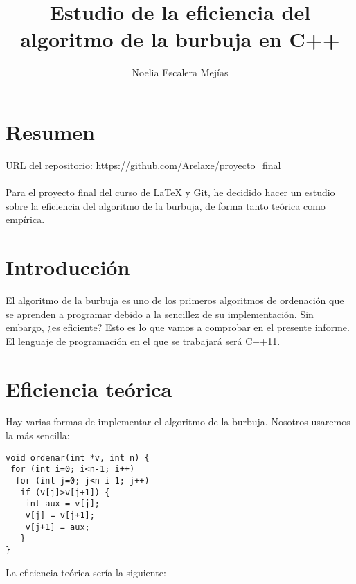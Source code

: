 \documentclass[a4paper,11pt]{article}
\begin{document}
\title{Estudio de la eficiencia del algoritmo de la burbuja en C++}
\author{Noelia Escalera Mejías}
\date{}
\maketitle
\section{Resumen}
URL del repositorio:
\url{https://github.com/Arelaxe/proyecto_final}
\\ \\
Para el proyecto final del curso de LaTeX y Git, he decidido hacer un estudio sobre la eficiencia del algoritmo de la burbuja, de forma tanto teórica como empírica.
\section{Introducción}
El algoritmo de la burbuja es uno de los primeros algoritmos de ordenación que se aprenden a programar debido a la sencillez de su implementación. Sin embargo, ¿es eficiente? Esto es lo que vamos a comprobar en el presente informe. El lenguaje de programación en el que se trabajará será C++11.
\section{Eficiencia teórica}
Hay varias formas de implementar el algoritmo de la burbuja. Nosotros usaremos la más sencilla:
\lstset{language=C, breaklines=true, basicstyle=\footnotesize}
\begin{lstlisting}[frame=single]
void ordenar(int *v, int n) {
 for (int i=0; i<n-1; i++)
  for (int j=0; j<n-i-1; j++)
   if (v[j]>v[j+1]) {
    int aux = v[j];
    v[j] = v[j+1];
    v[j+1] = aux;
   }
}
\end{lstlisting}
La eficiencia teórica sería la siguiente:
\end{document}
